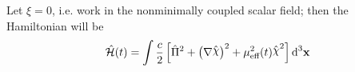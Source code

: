 Let $\xi=0$, i.e. work in the nonminimally coupled scalar field; then the Hamiltonian will be
\begin{equation}
	\hat{\mathcal{H}}(t)=\int\frac{c}{2}\left[\hat{\Pi}^2+\left(\mathbf{\nabla}\hat{\rchi}\right)^2+\mu_{\text{eff}}^2(t)\hat{\rchi}^2\right]\td^3\mathbf{x}
\end{equation}
\begin{comment}
	\begin{multline}
		\hat{\Pi}^2=\frac{1}{c^2}\int\frac{\td^3\mathbf{k}\td^3\mathbf{q}}{(2\pi\hbar)^6}\left[\hat{a}_\mathbf{k}\hat{a}_\mathbf{q}v'_\mathbf{k}v'_\mathbf{q}e^{-i(\mathbf{k}+\mathbf{q})\mathbf{x}\hbar^{-1}}+\hat{a}_\mathbf{k}\hat{a}_\mathbf{q}^\dagger v'_\mathbf{k}v^{'*}_\mathbf{q}e^{-i(\mathbf{k}-\mathbf{q})\mathbf{x}\hbar^{-1}}\right.+\\
		+\left.\hat{a}^\dagger_\mathbf{k}\hat{a}_\mathbf{q}v^{'*}_\mathbf{k}v'_\mathbf{q}e^{i(\mathbf{k}-\mathbf{q})\mathbf{x}\hbar^{-1}}+\hat{a}_\mathbf{k}^\dagger\hat{a}_\mathbf{q}^\dagger v^{'*}_\mathbf{k}v^{'*}_\mathbf{q}e^{i(\mathbf{k}+\mathbf{q})\mathbf{x}\hbar^{-1}}\right]
	\end{multline}
	\begin{multline}
		\left(\mathbf{\nabla}\hat{\rchi}\right)^2=-\frac{1}{\hbar^2}\int\frac{\td^3\mathbf{k}\td^3\mathbf{q}}{(2\pi\hbar)^6}\mathbf{k}\mathbf{q}\left[\hat{a}_\mathbf{k}\hat{a}_\mathbf{q}v_\mathbf{k}v_\mathbf{q}e^{-i(\mathbf{k}+\mathbf{q})\mathbf{x}\hbar^{-1}}-\hat{a}_\mathbf{k}\hat{a}_\mathbf{q}^\dagger v_\mathbf{k}v^*_\mathbf{q}e^{-i(\mathbf{k}-\mathbf{q})\mathbf{x}\hbar^{-1}}-\right.\\
		-\left.\hat{a}_\mathbf{k}^\dagger\hat{a}_\mathbf{q}v_\mathbf{k}^*v_\mathbf{q}e^{i(\mathbf{k}-\mathbf{q})\mathbf{x}\hbar^{-1}}+\hat{a}^\dagger_\mathbf{k}\hat{a}^\dagger_\mathbf{q}v^*_\mathbf{k}v^*_\mathbf{q}e^{i(\mathbf{k}+\mathbf{q})\mathbf{x}\hbar^{-1}}\right]
	\end{multline}
	\begin{multline}
		\hat{\rchi}^2=\int\frac{\td^3\mathbf{k}\td^3\mathbf{q}}{(2\pi\hbar)^6}\left[\hat{a}_\mathbf{k}\hat{a}_\mathbf{q}v_\mathbf{k}v_\mathbf{q}e^{-i(\mathbf{k}+\mathbf{q})\mathbf{x}\hbar^{-1}}+\hat{a}_\mathbf{k}\hat{a}_\mathbf{q}^\dagger v_\mathbf{k}v^*_\mathbf{q}e^{-i(\mathbf{k}-\mathbf{q})\mathbf{x}\hbar^{-1}}+\right.\\
		+\left.\hat{a}_\mathbf{k}^\dagger\hat{a}_\mathbf{q}v_\mathbf{k}^*v_\mathbf{q}e^{i(\mathbf{k}-\mathbf{q})\mathbf{x}\hbar^{-1}}+\hat{a}^\dagger_\mathbf{k}\hat{a}^\dagger_\mathbf{q}v^*_\mathbf{k}v^*_\mathbf{q}e^{i(\mathbf{k}+\mathbf{q})\mathbf{x}\hbar^{-1}}\right]

\end{comment}
